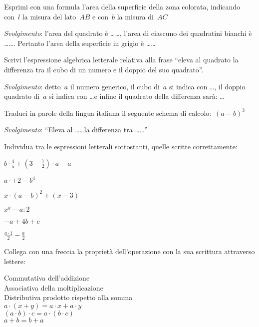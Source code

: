 \begin{multicols}{2}
\begin{esercizio}
\label{ese:8.1}
Esprimi con una formula l'area della superficie della zona colorata,
indicando con~\(l\) la misura del lato~\(AB\) e
con~\(b\) la misura di~\(AC\)

\emph{Svolgimento}: l'area del quadrato è \ldots\ldots,
l'area di ciascuno dei quadratini bianchi è \ldots\ldots. 
Pertanto l'area della superficie in
grigio è \ldots\ldots
\end{esercizio}

\begin{esercizio}
\label{ese:8.2}
Scrivi l'espressione algebrica letterale relativa alla frase ``eleva al 
quadrato la differenza tra il cubo di un numero e il doppio del suo quadrato''.

\emph{Svolgimento}: detto~\(a\) il numero generico, il cubo di~\(a\) si indica 
con \ldots, il doppio quadrato di~\(a\) si indica con \ldots e infine
il quadrato della differenza sarà: \ldots
\end{esercizio}

\begin{esercizio}
\label{ese:8.3}
Traduci in parole della lingua italiana il seguente schema di 
calcolo:~\((a-b)^{3}\)

\emph{Svolgimento}: ``Eleva al \ldots\ldots la differenza tra \ldots\ldots''
\end{esercizio}

\begin{esercizio}
 \label{ese:8.4}
Individua tra le espressioni letterali sottostanti, quelle scritte 
correttamente:
\begin{enumeratea}
\spazielenx
 \item \(b\cdot {\frac{4}{5}}+\left(3-\frac{7}{2}\right)\cdot a-a\)
 \item \(a\cdot +2-b^{4}\)
 \item \(x\cdot (a-b)^{2}+(x-3)\)
 \item \(x^{y}-a:2\)
 \item \(-a+4b+c\)
 \item \(\frac{a\cdot 1}{2}-\frac{a}{2}\)
\end{enumeratea}
\end{esercizio}
\end{multicols}

\begin{esercizio}
\label{ese:8.5}
 Collega con una freccia la proprietà dell'operazione con la sua scrittura 
 attraverso lettere:
 \begin{multicols}{2}
 \noindent
 Commutativa dell'addizione\\
 Associativa della moltiplicazione\\
 Distributiva prodotto rispetto alla somma\\
 \(a\cdot (x+y)=a\cdot x+a\cdot y\)\\
 \(\left(a\cdot b\right)\cdot c=a\cdot \left(b\cdot c\right)\)\\
 \({a+b=b+a}\)
 \end{multicols}
\end{esercizio}

